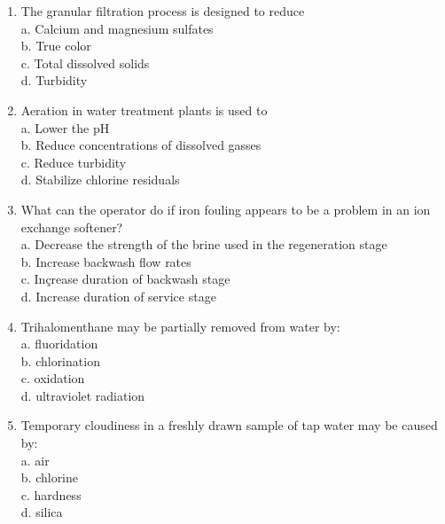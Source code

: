 \begin{enumerate}
\item The granular filtration process is designed to reduce\\
a. Calcium and magnesium sulfates\\
b. True color\\
c. Total dissolved solids\\
d. Turbidity\item Aeration in water treatment plants is used to\\
a. Lower the $\mathrm{pH}$\\
b. Reduce concentrations of dissolved gasses\\
c. Reduce turbidity\\
d. Stabilize chlorine residuals\\

\item What can the operator do if iron fouling appears to be a problem in an ion exchange softener?\\
a. Decrease the strength of the brine used in the regeneration stage\\
b. Increase backwash flow rates\\
c. Inçrease duration of backwash stage\\
d. Increase duration of service stage\\

\item Trihalomenthane may be partially removed from water by:\\
a. fluoridation\\
b. chlorination\\
c. oxidation\\
d. ultraviolet radiation\\

\item Temporary cloudiness in a freshly drawn sample of tap water may be caused by:\\
a. air\\
b. chlorine\\
c. hardness\\
d. silica\\

\end{enumerate}

